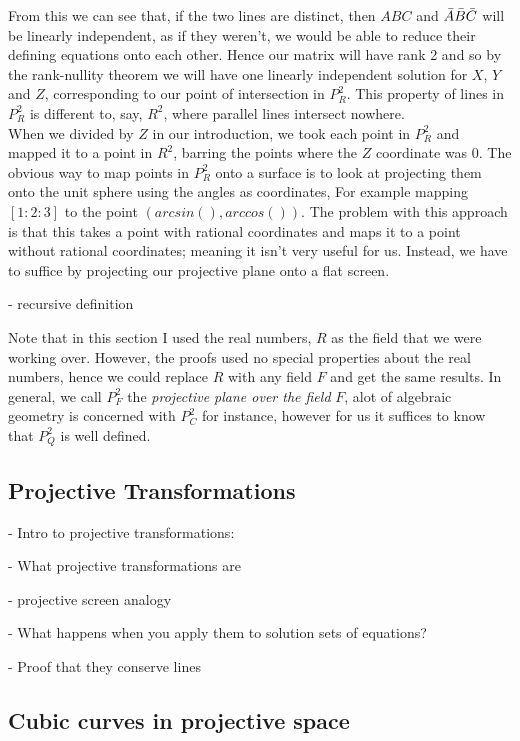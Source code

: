 \documentclass{article}
\begin{document}
From this we can see that, if the two lines are distinct, then $A  B  C$ and
$\Bar{A}  \Bar{B}  \Bar{C} $ will be linearly independent, as if they weren't, we would be able to reduce their defining equations onto each other. Hence our matrix will have rank 2 and so by the rank-nullity theorem we will have one linearly independent solution for $X$, $Y$ and $Z$, corresponding to our point of intersection in $P_R^2$. This property of lines in $P_R^2$ is different to, say, $R^2$, where parallel lines intersect nowhere.
\\
When we divided by $Z$ in our introduction, we took each point in $P_R^2$ and mapped it to a point in $R^2$, barring the points where the $Z$ coordinate was $0$. The obvious way to map points in $P_R^2$ onto a surface is to look at projecting them onto the unit sphere using the angles as coordinates, For example mapping $[1 : 2 : 3]$ to the point $(arcsin(), arccos())$. The problem with this approach is that this takes a point with rational coordinates and maps it to a point without rational coordinates; meaning it isn't very useful for us. Instead, we have to suffice by projecting our projective plane onto a flat screen.

- recursive definition

 Note that in this section I used the real numbers, $R$ as the field that we were working over. However, the proofs used no special properties about the real numbers, hence we could replace $R$ with any field $F$ and get the same results. In general, we call $P_F^2$ the \emph{projective plane over the field} $F$,  alot of algebraic geometry is concerned with $P_C^2$ for instance, however for us it suffices to know that $P_Q^2$ is well defined.

\subsection{Projective Transformations}

- Intro to projective transformations:

- What projective transformations are

- projective screen analogy

- What happens when you apply them to solution sets of equations?

- Proof that they conserve lines

\subsection{Cubic curves in projective space}
\end{document}
